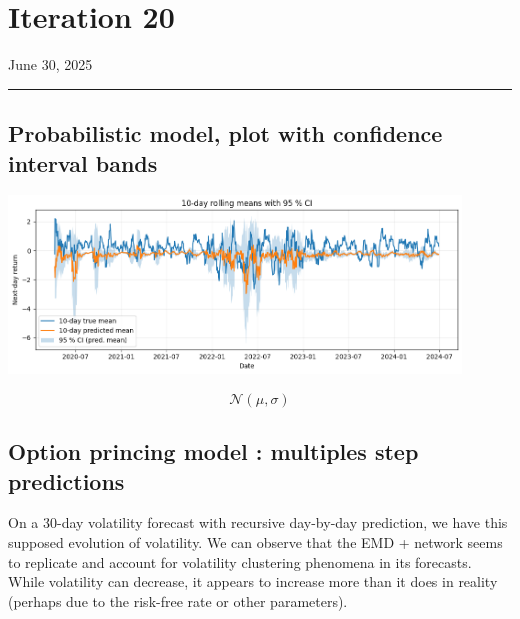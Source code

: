 \documentclass[letterpaper,11pt]{article}
\begin{document}




\newpage
\section*{Iteration 20}
\begin{flushright}
June 30, 2025
\end{flushright}
\hrule
\vspace{0.2in}




\subsection*{Probabilistic model, plot with confidence interval bands}


\begin{center}
\includegraphics[width=0.9\textwidth]{img/mean_95CI.png}
\end{center}
\[
\mathcal{N}(\mu, \sigma)
\]


\subsection*{Option princing model : multiples step predictions}

On a 30-day volatility forecast with recursive day-by-day prediction, we have this supposed evolution of volatility. We can observe that the EMD + network seems to replicate and account for volatility clustering phenomena in its forecasts. While volatility can decrease, it appears to increase more than it does in reality (perhaps due to the risk-free rate or other parameters).
\end{document}
